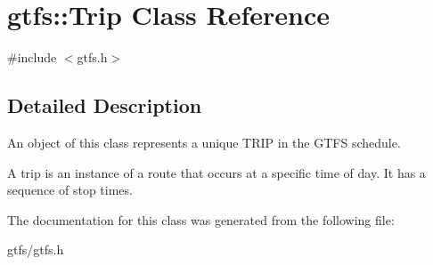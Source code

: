 \hypertarget{classgtfs_1_1Trip}{}\section{gtfs\+:\+:Trip Class Reference}
\label{classgtfs_1_1Trip}


{\ttfamily \#include $<$gtfs.\+h$>$}



\subsection{Detailed Description}
An object of this class represents a unique T\+R\+IP in the G\+T\+FS schedule.

A trip is an instance of a route that occurs at a specific time of day. It has a sequence of stop times. 

The documentation for this class was generated from the following file\+:\begin{DoxyCompactItemize}
\item 
gtfs/gtfs.\+h\end{DoxyCompactItemize}
